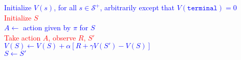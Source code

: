 \documentclass{standalone}
\begin{document}
\pagestyle{empty}
\begin{algorithm}[H]
  \KwInput{The policy $\pi$ to be evaluated; step size $\alpha \in (0, 1]$}
  \textcolor{blue}{Initialize $V(s)$, for all $s \in \mathcal S^+$, arbitrarily except that   $V(\texttt{terminal}) = 0$}\\
 {
  \textcolor{red}{Initialize $S$ \\}
   {
    \textcolor{blue}{$A \gets $ action given by $\pi$ for $S$ \\}
    \textcolor{red}{Take action $A$, observe $R$, $S'$ \\}
    \textcolor{blue}{$V(S) \gets V(S) + \alpha \left[ R + \gamma V(S') - V(S) \right]$ \\
    $S \gets S'$}
  }
}
\end{algorithm}
\end{document}
